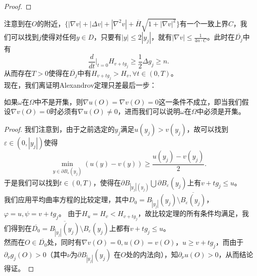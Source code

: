 \begin{enumerate}
\begin{proof}
\end{proof}
注意到在$O$的附近，$\{|\nabla v|+|\Delta v|+|\nabla^{2}v|+\overline{H}\sqrt{1+|\nabla v|^{2}}\}$有一个一致上界$C$，我们可以找到$j$使得对任何$y\in D$，只要有$|y|\leq 2|y_{j}|$，就有$|\nabla v|\leq \frac{1}{4n\cdot C}$。此时在$\overline{D_{j}}$中有
\begin{displaymath}
\frac{d}{dt}|_{t=0}H_{v+tg_{j}}\geq\frac{1}{2}\Delta g_{j}\geq n.
\end{displaymath}
从而存在$T>0$使得在$\overline{D_{j}}$中有$H_{v+tg_{j}}>H_{v},\forall t\in(0,T)$。\\
现在，我们离证明Alexandrov定理只差最后一步：
\begin{theorem}
如果$\omega$在$\Omega$中不是开集，则$\nabla u(O)=\nabla v(O)=0$这一条件不成立，即当我们假设$\nabla v(O)=0$时必须有$\nabla u(O)\neq 0$，进而我们可以说明$\omega$在$\Omega$中必须是开集。
\end{theorem}
\begin{proof}
我们注意到，由于之前选定的$y_{j}$满足$u(y_{j})>v(y_{j})$，故可以找到$\varepsilon\in(0,|y_{j}|)$使得
\begin{displaymath}
\min_{y\in\partial B_{\varepsilon}(y_{j})}(u(y)-v(y))\geq\frac{u(y_{j})-v(y_{j})}{2}.
\end{displaymath}
于是我们可以找到$t\in(0,T)$，使得在$\partial B_{|y_{j}|(y_{j})}\bigcup\partial B_{\varepsilon}(y_{j})$上有$v+tg_{j}\leq u$。\\
我们应用平均曲率方程的比较定理，其中$D_{0}=B_{|y_{j}|}(y_{j})\setminus \overline{B_{\varepsilon}(y_{j})}$，$\varphi=u, \psi=v+tg_{j}$。
由于$H_{u}=H_{v}<H_{v+tg_{j}}$，故比较定理的所有条件均满足，我们得到在$\overline{D_{0}}=\overline{B_{|y_{j}|}(y_{j})}\setminus B_{\varepsilon}(y_{j})$上都有$v+tg_{j}\leq u$。\\
然而在$O\in\overline{D_{0}}$处，同时有$\nabla v(O)=0, u(O)=v(O)，u\geq v+tg_{j}$，而由于$\partial_{\nu}g_{j}(O)>0$（其中$\nu$为$\partial B_{|y_{j}|}(y_{j})$ 在$O$处的内法向），知$\partial_{\nu}u(O)>0$，从而结论得证。
\end{proof}
\end{enumerate}
